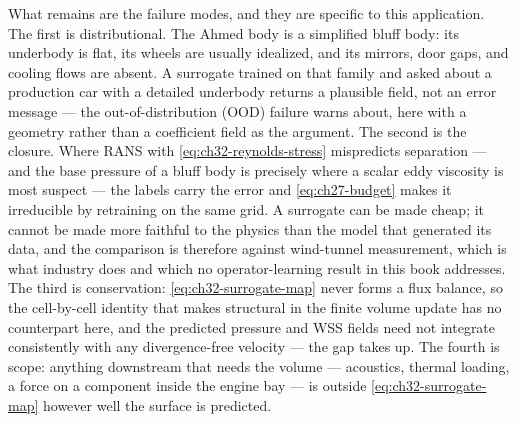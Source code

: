 What remains are the failure modes, and they are specific to this application. The first is
distributional. The Ahmed body is a simplified bluff body: its underbody
is flat, its wheels are usually idealized, and its mirrors, door gaps, and cooling flows are
absent. A surrogate trained on that family and asked about a production car with a detailed
underbody returns a plausible field, not an error message --- the out-of-distribution (OOD)
failure
 warns about, here with a geometry
rather than a coefficient field as the argument. The second is the closure. Where RANS with
\eqref{eq:ch32-reynolds-stress} mispredicts separation --- and the base pressure of a bluff body
is precisely where a scalar eddy viscosity is most suspect --- the labels carry the error and
\eqref{eq:ch27-budget} makes it irreducible by retraining on the same
grid. A surrogate can be
made cheap; it cannot be made more faithful to the physics than the model that generated its
data, and the comparison is therefore against wind-tunnel measurement, which is what
industry does and which no operator-learning result in this book addresses. The third is
conservation: \eqref{eq:ch32-surrogate-map} never forms a flux balance, so the cell-by-cell
identity that \cite{leveque2002finite} makes structural in the finite volume update has no
counterpart here, and the predicted
pressure and WSS fields need not integrate consistently with any divergence-free velocity ---
the gap  takes up. The fourth is
scope: anything downstream that needs the volume --- acoustics, thermal loading, a force on a
component inside the engine bay --- is outside \eqref{eq:ch32-surrogate-map} however well the
surface is predicted.



